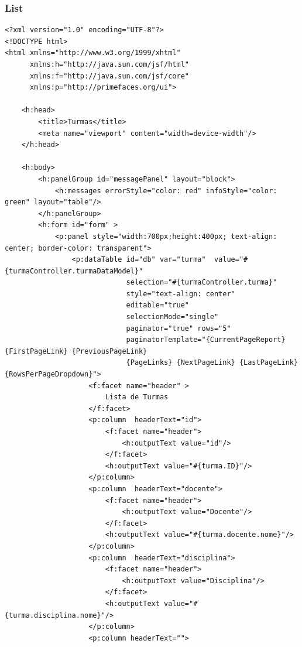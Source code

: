 \documentclass[12pt,a4paper]{article}
\begin{document}
\subsubsection{List}
\label{subsubsectionTurmaList}
\begin{lstlisting}
<?xml version="1.0" encoding="UTF-8"?>
<!DOCTYPE html>
<html xmlns="http://www.w3.org/1999/xhtml"
      xmlns:h="http://java.sun.com/jsf/html"
      xmlns:f="http://java.sun.com/jsf/core"
      xmlns:p="http://primefaces.org/ui">

    <h:head>
        <title>Turmas</title>
        <meta name="viewport" content="width=device-width"/>
    </h:head>

    <h:body>
        <h:panelGroup id="messagePanel" layout="block">
            <h:messages errorStyle="color: red" infoStyle="color: green" layout="table"/>
        </h:panelGroup>
        <h:form id="form" >
            <p:panel style="width:700px;height:400px; text-align: center; border-color: transparent">  
                <p:dataTable id="db" var="turma"  value="#{turmaController.turmaDataModel}"
                             selection="#{turmaController.turma}"
                             style="text-align: center"
                             editable="true"
                             selectionMode="single"
                             paginator="true" rows="5"  
                             paginatorTemplate="{CurrentPageReport}  {FirstPageLink} {PreviousPageLink} 
                             {PageLinks} {NextPageLink} {LastPageLink} {RowsPerPageDropdown}">  
                    <f:facet name="header" >  
                        Lista de Turmas
                    </f:facet>  
                    <p:column  headerText="id">
                        <f:facet name="header">
                            <h:outputText value="id"/>
                        </f:facet>
                        <h:outputText value="#{turma.ID}"/>
                    </p:column>
                    <p:column  headerText="docente">  
                        <f:facet name="header">
                            <h:outputText value="Docente"/>
                        </f:facet>
                        <h:outputText value="#{turma.docente.nome}"/>
                    </p:column> 
                    <p:column  headerText="disciplina">  
                        <f:facet name="header">
                            <h:outputText value="Disciplina"/>
                        </f:facet>
                        <h:outputText value="#{turma.disciplina.nome}"/>
                    </p:column> 
                    <p:column headerText="">

\end{lstlisting}
\end{document}
